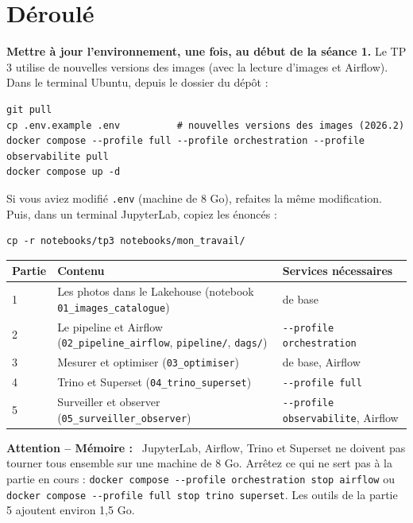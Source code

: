 \documentclass[11pt,a4paper]{article}
\newenvironment{attention}[1][]{\par\medskip\noindent\textbf{\textcolor{lhred}{Attention\if\relax\detokenize{#1}\relax\else{} -- #1\fi{} :}}\ }{\par\medskip}
\newcommand{\cmd}[1]{\texttt{#1}}
\newcommand{\nb}[1]{\textcolor{lhblue}{\texttt{#1}}}
\begin{document}
\section{Déroulé}\label{sec:deroule}

\textbf{Mettre à jour l'environnement, une fois, au début de la séance 1.} Le TP 3 utilise de
nouvelles versions des images (avec la lecture d'images et Airflow). Dans le terminal Ubuntu, depuis
le dossier du dépôt :
\begin{lstlisting}[style=shell]
git pull
cp .env.example .env          # nouvelles versions des images (2026.2)
docker compose --profile full --profile orchestration --profile observabilite pull
docker compose up -d
\end{lstlisting}
Si vous aviez modifié \cmd{.env} (machine de 8 Go), refaites la même modification. Puis, dans un
terminal JupyterLab, copiez les énoncés :
\begin{lstlisting}[style=shell]
cp -r notebooks/tp3 notebooks/mon_travail/
\end{lstlisting}

\begin{center}
\small
\renewcommand{\arraystretch}{1.25}
\begin{tabularx}{\textwidth}{@{}l X l@{}}
\toprule
\textbf{Partie} & \textbf{Contenu} & \textbf{Services nécessaires} \\
\midrule
1 & Les photos dans le Lakehouse (notebook \nb{01\_images\_catalogue}) & de base \\
2 & Le pipeline et Airflow (\nb{02\_pipeline\_airflow}, \nb{pipeline/}, \nb{dags/}) & \cmd{-{}-profile orchestration} \\
3 & Mesurer et optimiser (\nb{03\_optimiser}) & de base, Airflow \\
4 & Trino et Superset (\nb{04\_trino\_superset}) & \cmd{-{}-profile full} \\
5 & Surveiller et observer (\nb{05\_surveiller\_observer}) & \cmd{-{}-profile observabilite}, Airflow \\
\bottomrule
\end{tabularx}
\end{center}

\begin{attention}[Mémoire]
JupyterLab, Airflow, Trino et Superset ne doivent pas tourner tous ensemble sur une
machine de 8 Go. Arrêtez ce qui ne sert pas à la partie en cours :
\cmd{docker compose -{}-profile orchestration stop airflow} ou
\cmd{docker compose -{}-profile full stop trino superset}. Les outils de la partie 5 ajoutent
environ 1,5 Go.
\end{attention}
\end{document}
